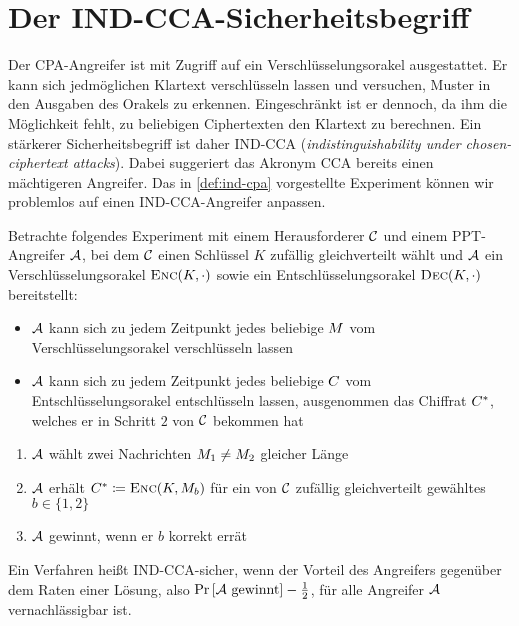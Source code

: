\section{Der IND-CCA-Sicherheitsbegriff}
Der CPA-Angreifer ist mit Zugriff auf ein Verschlüsselungsorakel ausgestattet. Er kann sich jedmöglichen Klartext verschlüsseln lassen und
versuchen, Muster in den Ausgaben des Orakels zu erkennen. Eingeschränkt ist er dennoch, da ihm die Möglichkeit fehlt, zu beliebigen
Ciphertexten den Klartext zu berechnen. Ein stärkerer Sicherheitsbegriff ist daher IND-CCA (\emph{indistinguishability under chosen-ciphertext attacks}). Dabei suggeriert das Akronym CCA bereits einen mächtigeren Angreifer. Das in \ref{def:ind-cpa} vorgestellte Experiment können wir problemlos auf einen IND-CCA-Angreifer anpassen.

\begin{definition}
	Betrachte folgendes Experiment mit einem Herausforderer $\mathcal{C}$ und einem PPT-Angreifer $\mathcal{A}$, bei dem $\mathcal{C}$ einen Schlüssel $K$ zufällig gleichverteilt wählt und $\mathcal{A}$ ein Verschlüsselungsorakel $\textsc{Enc}(K,\cdot)$ sowie ein Entschlüsselungsorakel $\textsc{Dec}(K,\cdot)$ bereitstellt:
	\begin{itemize}
		\item $\mathcal{A}$ kann sich zu jedem Zeitpunkt jedes beliebige $M$ vom Verschlüsselungsorakel verschlüsseln lassen
		\item $\mathcal{A}$ kann sich zu jedem Zeitpunkt jedes beliebige $C$ vom Entschlüsselungsorakel entschlüsseln lassen, ausgenommen das Chiffrat $C^{\ast}$, welches er in Schritt $2$ von $\mathcal{C}$ bekommen hat
	\end{itemize}
	\begin{enumerate}
		\item $\mathcal{A}$ wählt zwei Nachrichten $M_1 \neq M_2$ gleicher Länge
		\item $\mathcal{A}$ erhält $C^{\ast} \coloneqq \textsc{Enc}(K, M_{b})$ für ein von $\mathcal{C}$ zufällig gleichverteilt gewähltes $b \in \{1, 2\}$
		\item $\mathcal{A}$ gewinnt, wenn er $b$ korrekt errät
	\end{enumerate}
	Ein Verfahren heißt IND-CCA-sicher, wenn der Vorteil des Angreifers gegenüber dem Raten einer Lösung, also $\Pr \left[\mathcal{A} \textnormal{ gewinnt} \right] - \frac{1}{2}$, für alle Angreifer $\mathcal{A}$ vernachlässigbar ist. 
\end{definition}
